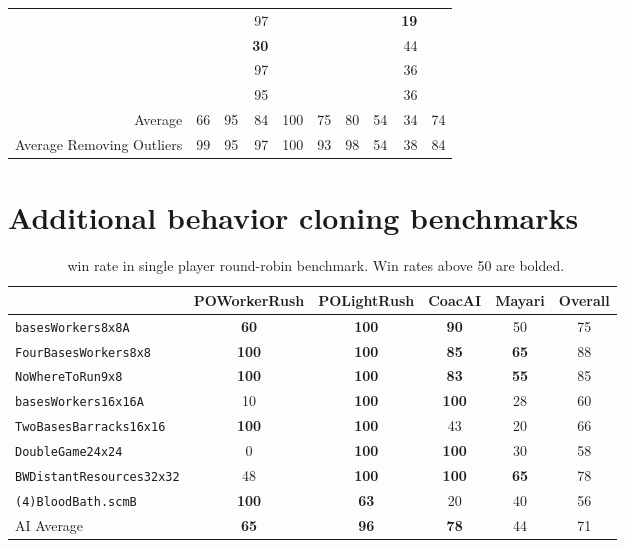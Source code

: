 \documentclass{article}
\begin{document}
\begin{table}[H]
\begin{center}
\begin{tabular}{r|rrrrrrrr|l}
    & \multicolumn{1}{l}{} & \multicolumn{1}{l}{} & 97 & \multicolumn{1}{l}{} & \multicolumn{1}{l}{} & \multicolumn{1}{l}{} & \multicolumn{1}{l}{} & \textbf{19} &  \\
    & \multicolumn{1}{l}{} & \multicolumn{1}{l}{} & \textbf{30} & \multicolumn{1}{l}{} & \multicolumn{1}{l}{} & \multicolumn{1}{l}{} & \multicolumn{1}{l}{} & 44 &  \\
    & \multicolumn{1}{l}{} & \multicolumn{1}{l}{} & 97 & \multicolumn{1}{l}{} & \multicolumn{1}{l}{} & \multicolumn{1}{l}{} & \multicolumn{1}{l}{} & 36 &  \\
    & \multicolumn{1}{l}{} & \multicolumn{1}{l}{} & 95 & \multicolumn{1}{l}{} &
    \multicolumn{1}{l}{} & \multicolumn{1}{l}{} & \multicolumn{1}{l}{} & 36 &  \\
    \hline
   Average & 66 & 95 & 84 & 100 & 75 & 80 & 54 & 34 & \multicolumn{1}{r}{74} \\
    Average Removing Outliers & 99 & 95 & 97 & 100 & 93 & 98 & 54 & 38 & \multicolumn{1}{r}{84} \\
    \end{tabular}
\end{center}
\end{table}

\section{Additional behavior cloning benchmarks}
\begin{table}[H]
    \caption{\bcAgent\ win rate in single player round-robin benchmark. Win rates above 50 are bolded.}
    \label{tab:bc-winrate}
    \begin{center}
    \begin{tabular}{lcccc|c}
     & POWorkerRush & POLightRush & CoacAI & Mayari & Overall \\
    \midrule
    \texttt{basesWorkers8x8A} & \textbf{60} & \textbf{100} & \textbf{90} & 50 & 75 \\
    \texttt{FourBasesWorkers8x8} & \textbf{100} & \textbf{100} & \textbf{85} & \textbf{65} & 88 \\
    \texttt{NoWhereToRun9x8} & \textbf{100} & \textbf{100} & \textbf{83} & \textbf{55} & 85 \\
    \texttt{basesWorkers16x16A} & 10 & \textbf{100} & \textbf{100} & 28 & 60 \\
    \texttt{TwoBasesBarracks16x16} & \textbf{100} & \textbf{100} & 43 & 20 & 66 \\
    \texttt{DoubleGame24x24} & 0 & \textbf{100} & \textbf{100} & 30 & 58 \\
    \texttt{BWDistantResources32x32} & 48 & \textbf{100} & \textbf{100} & \textbf{65} & 78 \\
    \texttt{(4)BloodBath.scmB} & \textbf{100} & \textbf{63} & 20 & 40 & 56 \\
    \hline
    AI Average & \textbf{65} & \textbf{96} & \textbf{78} & 44 & 71 \\
    \end{tabular}
    \end{center}
\end{table}
\end{document}
